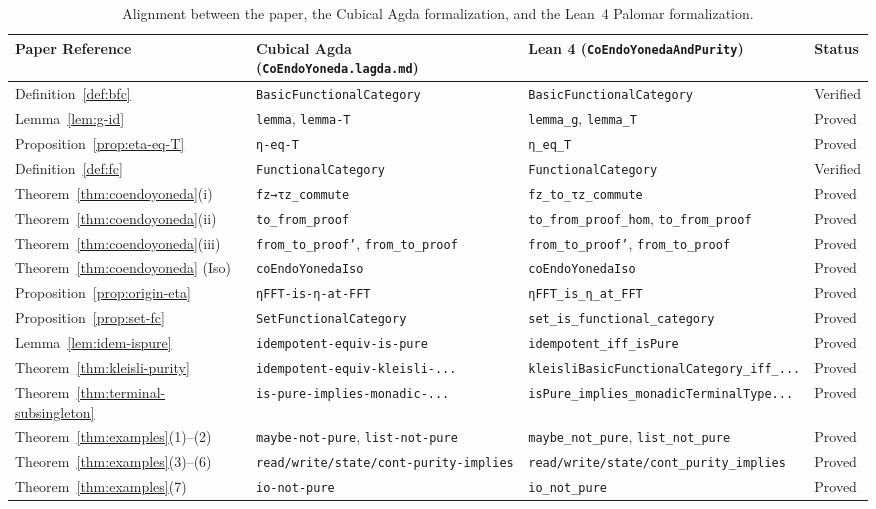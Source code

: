 \documentclass[11pt,a4paper]{article}
\theoremstyle{definition}
\theoremstyle{remark}
\begin{document}
\begin{table}[htbp]
\centering
\scriptsize
\renewcommand{\arraystretch}{1.2}
\begin{tabular}{@{}llll@{}}
\toprule
\textbf{Paper Reference} & \textbf{Cubical Agda (\texttt{CoEndoYoneda.lagda.md})} & \textbf{Lean 4 (\texttt{CoEndoYonedaAndPurity})} & \textbf{Status} \\
\midrule
Definition~\ref{def:bfc} & \texttt{BasicFunctionalCategory} & \texttt{BasicFunctionalCategory} & Verified \\
Lemma~\ref{lem:g-id} & \texttt{lemma}, \texttt{lemma-T} & \texttt{lemma\_g}, \texttt{lemma\_T} & Proved \\
Proposition~\ref{prop:eta-eq-T} & \texttt{η-eq-T} & \texttt{η\_eq\_T} & Proved \\
Definition~\ref{def:fc} & \texttt{FunctionalCategory} & \texttt{FunctionalCategory} & Verified \\
Theorem~\ref{thm:coendoyoneda}(i) & \texttt{fz→τz\_commute} & \texttt{fz\_to\_τz\_commute} & Proved \\
Theorem~\ref{thm:coendoyoneda}(ii) & \texttt{to\_from\_proof} & \texttt{to\_from\_proof\_hom}, \texttt{to\_from\_proof} & Proved \\
Theorem~\ref{thm:coendoyoneda}(iii) & \texttt{from\_to\_proof'}, \texttt{from\_to\_proof} & \texttt{from\_to\_proof'}, \texttt{from\_to\_proof} & Proved \\
Theorem~\ref{thm:coendoyoneda} (Iso) & \texttt{coEndoYonedaIso} & \texttt{coEndoYonedaIso} & Proved \\
Proposition~\ref{prop:origin-eta} & \texttt{ηFFT-is-η-at-FFT} & \texttt{ηFFT\_is\_η\_at\_FFT} & Proved \\
Proposition~\ref{prop:set-fc} & \texttt{SetFunctionalCategory} & \texttt{set\_is\_functional\_category} & Proved \\
Lemma~\ref{lem:idem-ispure} & \texttt{idempotent-equiv-is-pure} & \texttt{idempotent\_iff\_isPure} & Proved \\
Theorem~\ref{thm:kleisli-purity} & \texttt{idempotent-equiv-kleisli-...} & \texttt{kleisliBasicFunctionalCategory\_iff\_...} & Proved \\
Theorem~\ref{thm:terminal-subsingleton} & \texttt{is-pure-implies-monadic-...} & \texttt{isPure\_implies\_monadicTerminalType...} & Proved \\
Theorem~\ref{thm:examples}(1)--(2) & \texttt{maybe-not-pure}, \texttt{list-not-pure} & \texttt{maybe\_not\_pure}, \texttt{list\_not\_pure} & Proved \\
Theorem~\ref{thm:examples}(3)--(6) & \texttt{read/write/state/cont-purity-implies} & \texttt{read/write/state/cont\_purity\_implies} & Proved \\
Theorem~\ref{thm:examples}(7) & \texttt{io-not-pure} & \texttt{io\_not\_pure} & Proved \\
\bottomrule
\end{tabular}
\caption{Alignment between the paper, the Cubical Agda formalization, and the Lean~4 Palomar formalization.}
\label{tab:alignment}
\end{table}
\end{document}
